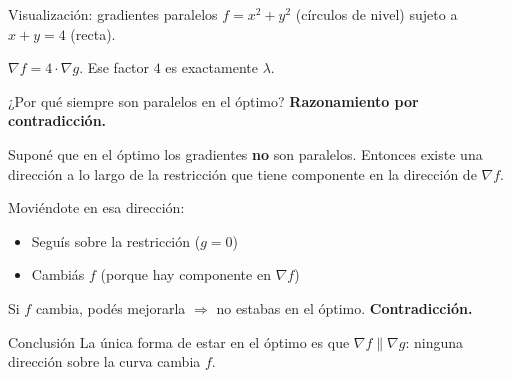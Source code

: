 \documentclass{beamer}
\begin{document}
\begin{frame}{Visualización: gradientes paralelos}
    \small
    $f = x^2 + y^2$ (círculos de nivel) sujeto a $x + y = 4$ (recta).

    \vspace{0.3em}

    \begin{center}
    \shorthandoff{>}
    \shorthandon{>}
    \end{center}

    $\nabla f = 4 \cdot \nabla g$. Ese factor $4$ es exactamente $\lambda$.
\end{frame}

\begin{frame}{¿Por qué siempre son paralelos en el óptimo?}
    \small
    \textbf{Razonamiento por contradicción.}

    \vspace{0.3em}

    Suponé que en el óptimo los gradientes \textbf{no} son paralelos. Entonces existe una dirección a lo largo de la restricción que tiene componente en la dirección de $\nabla f$.

    \vspace{0.5em}

    Moviéndote en esa dirección:
    \begin{itemize}
        \item Seguís sobre la restricción ($g = 0$)
        \item Cambiás $f$ (porque hay componente en $\nabla f$)
    \end{itemize}

    \vspace{0.5em}

    Si $f$ cambia, podés mejorarla $\Rightarrow$ no estabas en el óptimo. \textbf{Contradicción.}

    \vspace{0.5em}

    \begin{alertblock}{Conclusión}
        La única forma de estar en el óptimo es que $\nabla f \parallel \nabla g$: ninguna dirección sobre la curva cambia $f$.
    \end{alertblock}
\end{frame}
\end{document}

